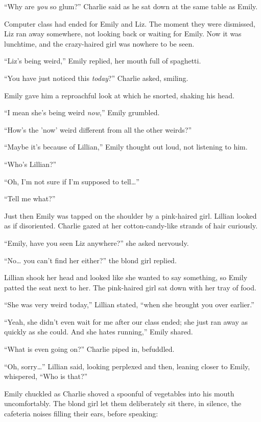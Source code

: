 “Why are \textit{you} so glum?” Charlie said as he sat down at the same table as Emily.

Computer class had ended for Emily and Liz. The moment they were dismissed, Liz ran away somewhere, not looking back or waiting for Emily. Now it was lunchtime, and the crazy-haired girl was nowhere to be seen.

“Liz's being weird,” Emily replied, her mouth full of spaghetti.

“You have just noticed this \textit{today}?” Charlie asked, smiling.

Emily gave him a reproachful look at which he snorted, shaking his head.

“I mean she's being weird \textit{now},” Emily grumbled.

“How's the 'now' weird different from all the other weirds?”

“Maybe it's because of Lillian,” Emily thought out loud, not listening to him.

“Who's Lillian?”

“Oh, I'm not sure if I'm supposed to tell…”

“Tell me what?”

Just then Emily was tapped on the shoulder by a pink-haired girl. Lillian looked as if disoriented. Charlie gazed at her cotton-candy-like strands of hair curiously.

“Emily, have you seen Liz anywhere?” she asked nervously.

“No… you can't find her either?” the blond girl replied.

Lillian shook her head and looked like she wanted to say something, so Emily patted the seat next to her. The pink-haired girl sat down with her tray of food.

“She was very weird today,” Lillian stated, “when she brought you over earlier.”

“Yeah, she didn't even wait for me after our class ended; she just ran away as quickly as she could. And she hates running,” Emily shared.

“What is even going on?” Charlie piped in, befuddled.

“Oh, sorry…” Lillian said, looking perplexed and then, leaning closer to Emily, whispered, “Who is that?”

Emily chuckled as Charlie shoved a spoonful of vegetables into his mouth uncomfortably. The blond girl let them deliberately sit there, in silence, the cafeteria noises filling their ears, before speaking:

